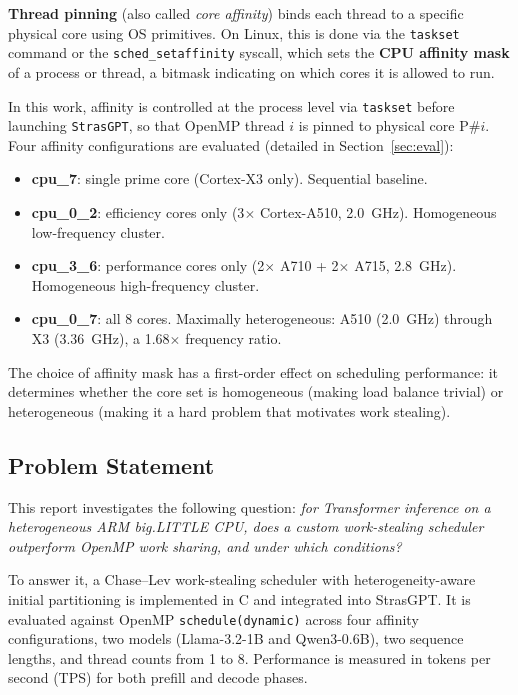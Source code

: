 \documentclass[11pt,english]{article}
\begin{document}
\textbf{Thread pinning} (also called \emph{core affinity}) binds each thread to a specific physical core using OS primitives. On Linux, this is done via the \texttt{taskset} command or the \texttt{sched\_setaffinity} syscall, which sets the \textbf{CPU affinity mask} of a process or thread, a bitmask indicating on which cores it is allowed to run.

In this work, affinity is controlled at the process level via \texttt{taskset} before launching \texttt{StrasGPT}, so that OpenMP thread $i$ is pinned to physical core P\#$i$. Four affinity configurations are evaluated (detailed in Section~\ref{sec:eval}):

\begin{itemize}
    \item \textbf{cpu\_7}: single prime core (Cortex-X3 only). Sequential baseline.
    \item \textbf{cpu\_0\_2}: efficiency cores only (3$\times$ Cortex-A510, 2.0~GHz). Homogeneous low-frequency cluster.
    \item \textbf{cpu\_3\_6}: performance cores only (2$\times$ A710 + 2$\times$ A715, 2.8~GHz). Homogeneous high-frequency cluster.
    \item \textbf{cpu\_0\_7}: all 8 cores. Maximally heterogeneous: A510 (2.0~GHz) through X3 (3.36~GHz), a 1.68$\times$ frequency ratio.
\end{itemize}

The choice of affinity mask has a first-order effect on scheduling performance: it determines whether the core set is homogeneous (making load balance trivial) or heterogeneous (making it a hard problem that motivates work stealing).

\subsection{Problem Statement}

This report investigates the following question: \emph{for Transformer inference on a heterogeneous ARM big.LITTLE CPU, does a custom work-stealing scheduler outperform OpenMP work sharing, and under which conditions?}

To answer it, a Chase--Lev work-stealing scheduler with heterogeneity-aware initial partitioning is implemented in C and integrated into StrasGPT. It is evaluated against OpenMP \texttt{schedule(dynamic)} across four affinity configurations, two models (Llama-3.2-1B and Qwen3-0.6B), two sequence lengths, and thread counts from 1 to 8. Performance is measured in tokens per second (TPS) for both prefill and decode phases.
\end{document}
